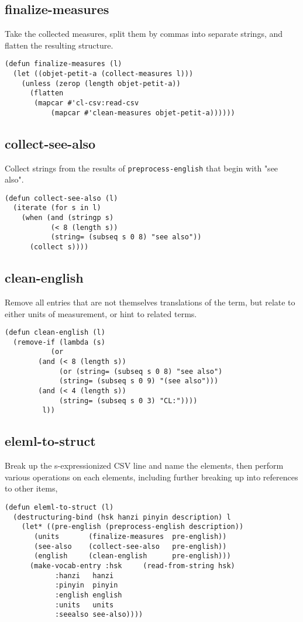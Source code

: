 \documentclass[11pt]{article}
\begin{document}
\subsection{finalize-measures}
\label{sec-3-6}
Take the collected measures, split them by commas into separate
strings, and flatten the resulting structure.
\begin{verbatim}
(defun finalize-measures (l)
  (let ((objet-petit-a (collect-measures l)))
    (unless (zerop (length objet-petit-a))
      (flatten
       (mapcar #'cl-csv:read-csv
	       (mapcar #'clean-measures objet-petit-a))))))
\end{verbatim}
\subsection{collect-see-also}
\label{sec-3-7}
Collect strings from the results of \texttt{preprocess-english} that begin with "see
also".
\begin{verbatim}
(defun collect-see-also (l)
  (iterate (for s in l)
    (when (and (stringp s)
	       (< 8 (length s))
	       (string= (subseq s 0 8) "see also"))
      (collect s))))
\end{verbatim}
\subsection{clean-english}
\label{sec-3-8}
Remove all entries that are not themselves translations of the term,
but relate to either units of measurement, or hint to related terms.
\begin{verbatim}
(defun clean-english (l)
  (remove-if (lambda (s)
	       (or
		(and (< 8 (length s))
		     (or (string= (subseq s 0 8) "see also")
			 (string= (subseq s 0 9) "(see also")))
		(and (< 4 (length s))
		     (string= (subseq s 0 3) "CL:"))))
	     l))
\end{verbatim}
\subsection{eleml-to-struct}
\label{sec-3-9}
Break up the s-expressionized CSV line and name the elements, then perform
various operations on each elements, including further breaking up into
references to other items,
\begin{verbatim}
(defun eleml-to-struct (l)
  (destructuring-bind (hsk hanzi pinyin description) l
    (let* ((pre-english (preprocess-english description))
	   (units       (finalize-measures  pre-english))
	   (see-also    (collect-see-also   pre-english))
	   (english     (clean-english      pre-english)))
      (make-vocab-entry :hsk     (read-from-string hsk)
			:hanzi   hanzi
			:pinyin  pinyin
			:english english
			:units   units
			:seealso see-also))))
\end{verbatim}
\end{document}
